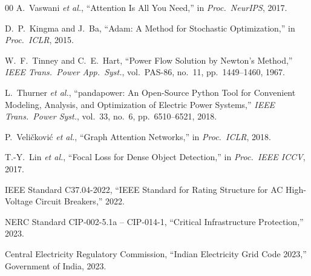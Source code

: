 \documentclass[conference]{IEEEtran}
\begin{document}
\begin{thebibliography}{00}
A.~Vaswani \textit{et al.}, ``Attention Is All You Need,'' in \textit{Proc.\ NeurIPS}, 2017.

D.~P.~Kingma and J.~Ba, ``Adam: A Method for Stochastic Optimization,'' in \textit{Proc.\ ICLR}, 2015.

W.~F.~Tinney and C.~E.~Hart, ``Power Flow Solution by Newton's Method,'' \textit{IEEE Trans.\ Power App.\ Syst.}, vol.~PAS-86, no.~11, pp.~1449--1460, 1967.

L.~Thurner \textit{et al.}, ``pandapower: An Open-Source Python Tool for Convenient Modeling, Analysis, and Optimization of Electric Power Systems,'' \textit{IEEE Trans.\ Power Syst.}, vol.~33, no.~6, pp.~6510--6521, 2018.

P.~Veli\v{c}kovi\'{c} \textit{et al.}, ``Graph Attention Networks,'' in \textit{Proc.\ ICLR}, 2018.

T.-Y.~Lin \textit{et al.}, ``Focal Loss for Dense Object Detection,'' in \textit{Proc.\ IEEE ICCV}, 2017.

IEEE Standard C37.04-2022, ``IEEE Standard for Rating Structure for AC High-Voltage Circuit Breakers,'' 2022.

NERC Standard CIP-002-5.1a -- CIP-014-1, ``Critical Infrastructure Protection,'' 2023.

Central Electricity Regulatory Commission, ``Indian Electricity Grid Code 2023,'' Government of India, 2023.

\end{thebibliography}
\end{document}
